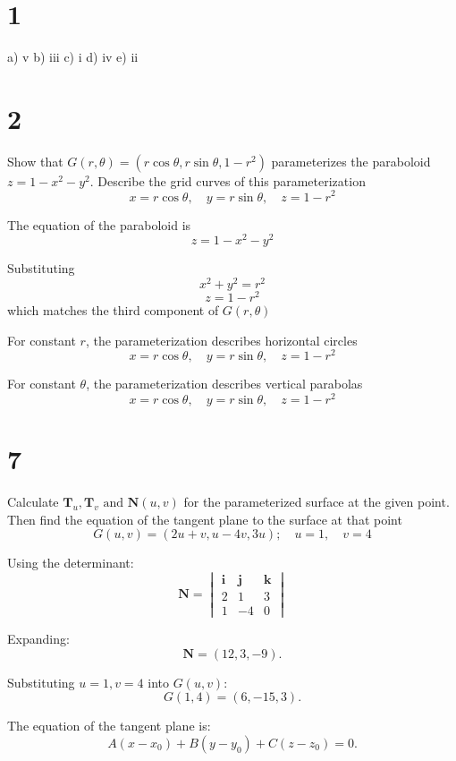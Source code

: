 \documentclass[hidelinks]{article}
\begin{document}
\section*{1}
    a) v 
    \newline
    b) iii 
    \newline
    c) i 
    \newline
    d) iv 
    \newline
    e) ii
\newpage
\section*{2}
Show that $G(r, \theta) = (r \cos \theta, r \sin \theta, 1 - r^2)$ parameterizes the paraboloid $z = 1 - x^2 - y^2$. Describe the grid curves of this parameterization
\[
x = r \cos \theta, \quad y = r \sin \theta, \quad z = 1 - r^2
\]

The equation of the paraboloid is
\[
z = 1 - x^2 - y^2
\]

Substituting
\[
x^2 + y^2 = r^2
\]
\[
z = 1 - r^2
\]
which matches the third component of \( G(r, \theta) \)

For constant \( r \), the parameterization describes horizontal circles
\[
x = r \cos \theta, \quad y = r \sin \theta, \quad z = 1 - r^2
\]

For constant \( \theta \), the parameterization describes vertical parabolas
\[
x = r \cos \theta, \quad y = r \sin \theta, \quad z = 1 - r^2
\]
\newpage
\section*{7}
Calculate $\textbf{T}_u, \textbf{T}_v \text{ and } \textbf{N}(u, v)$ for the parameterized surface at the given point. Then find the equation of the tangent plane to the surface at that point
\[
    G(u,v) = (2u+v, u-4v, 3u); \quad u = 1, \quad v = 4
\]

Using the determinant:
\[
\mathbf{N} =
\begin{vmatrix}
\mathbf{i} & \mathbf{j} & \mathbf{k} \\
2 & 1 & 3 \\
1 & -4 & 0
\end{vmatrix}
\]

Expanding:
\[
\mathbf{N} = (12, 3, -9).
\]

Substituting \( u = 1, v = 4 \) into \( G(u,v) \):
\[
G(1,4) = (6, -15, 3).
\]

The equation of the tangent plane is:
\[
A(x - x_0) + B(y - y_0) + C(z - z_0) = 0.
\]
\end{document}
